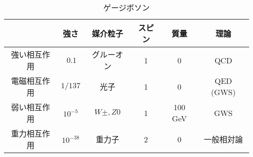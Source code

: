 \documentclass[a4paper,11pt]{jlreq}
\begin{document}
\begin{table}[h]
  \centering
  \begin{tabular}{|c|ccccc|}
    \hline
           & 強さ         & 媒介粒子       & スピン & 質量      & 理論        \\
    \hline
    強い相互作用 & $~0.1$     & グルーオン      & 1   & 0       & QCD       \\
    電磁相互作用 & $1/137$    & 光子         & 1   & 0       & QED (GWS) \\
    弱い相互作用 & $10^{-5}$  & $W\pm,	Z0$ & 1   & 100 GeV & GWS       \\
    重力相互作用 & $10^{-38}$ & 重力子        & 2   & 0       & 一般相対論     \\
    \hline
  \end{tabular}
  \caption{ゲージボソン}
  \label{table:guage}
\end{table}
\end{document}
